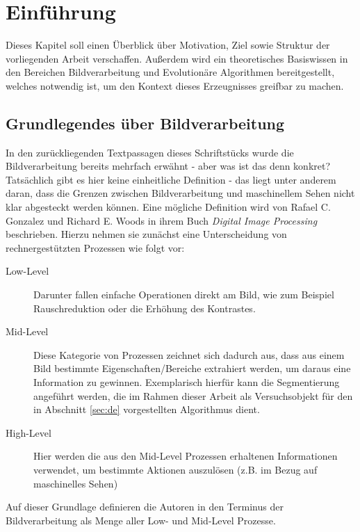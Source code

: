 \chapter{Einführung}
\label{sec:intro}
	Dieses Kapitel soll einen Überblick über Motivation, Ziel sowie Struktur der vorliegenden Arbeit verschaffen. Außerdem wird ein theoretisches Basiswissen in den Bereichen Bildverarbeitung und Evolutionäre Algorithmen bereitgestellt, welches notwendig ist, um den Kontext dieses Erzeugnisses greifbar zu machen. 
		
	\section{Grundlegendes über Bildverarbeitung}
	\label{sec:bild-basics}
		
		In den zurückliegenden Textpassagen dieses Schriftstücks wurde die Bildverarbeitung bereits mehrfach erwähnt - aber was ist das denn konkret? Tatsächlich gibt es hier keine einheitliche Definition - das liegt unter anderem daran, dass die Grenzen zwischen Bildverarbeitung und maschinellem Sehen nicht klar abgesteckt werden können. Eine mögliche Definition wird von Rafael C. Gonzalez und Richard E. Woods in ihrem Buch \textit{Digital Image Processing} \cite{gonzalez-woods-imgproc} beschrieben. Hierzu nehmen sie zunächst eine Unterscheidung von rechnergestützten Prozessen wie folgt vor: 
		\begin{description}
			\item[Low-Level] Darunter fallen einfache Operationen direkt am Bild, wie zum Beispiel Rauschreduktion oder die Erhöhung des Kontrastes.
			\item[Mid-Level] Diese Kategorie von Prozessen zeichnet sich dadurch aus, dass aus einem Bild bestimmte Eigenschaften/Bereiche extrahiert werden, um daraus eine Information zu gewinnen. Exemplarisch hierfür kann die Segmentierung angeführt werden, die im Rahmen dieser Arbeit als Versuchsobjekt für den in Abschnitt \ref{sec:de} vorgestellten Algorithmus dient.
			\item[High-Level] Hier werden die aus den Mid-Level Prozessen erhaltenen Informationen verwendet, um bestimmte Aktionen auszulösen (z.B. im Bezug auf maschinelles Sehen)
		\end{description}
		
		Auf dieser Grundlage definieren die Autoren in \cite{gonzalez-woods-imgproc} den Terminus der Bildverarbeitung als Menge aller Low- und Mid-Level Prozesse. 
		
	
